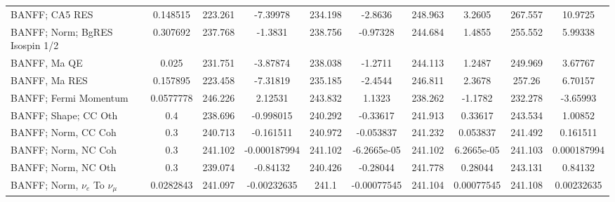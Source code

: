 \begin{tabular}{| l | S | S  S | S  S | S  S | S  S | }
                                                                  BANFF; CA5 RES &        0.148515 &         223.261 &        -7.39978 &         234.198 &         -2.8636 &         248.963 &          3.2605 &         267.557 &         10.9725 \\ 
                                                  BANFF; Norm; BgRES Isospin 1/2 &        0.307692 &         237.768 &         -1.3831 &         238.756 &        -0.97328 &         244.684 &          1.4855 &         255.552 &         5.99338 \\ 
                                                                    BANFF, Ma QE &           0.025 &         231.751 &        -3.87874 &         238.038 &         -1.2711 &         244.113 &          1.2487 &         249.969 &         3.67767 \\ 
                                                                   BANFF, Ma RES &        0.157895 &         223.458 &        -7.31819 &         235.185 &         -2.4544 &         246.811 &          2.3678 &          257.26 &         6.70157 \\ 
                                                           BANFF; Fermi Momentum &       0.0577778 &         246.226 &         2.12531 &         243.832 &          1.1323 &         238.262 &         -1.1782 &         232.278 &        -3.65993 \\ 
                                                            BANFF; Shape; CC Oth &             0.4 &         238.696 &       -0.998015 &         240.292 &        -0.33617 &         241.913 &         0.33617 &         243.534 &         1.00852 \\ 
                                                             BANFF; Norm, CC Coh &             0.3 &         240.713 &       -0.161511 &         240.972 &       -0.053837 &         241.232 &        0.053837 &         241.492 &        0.161511 \\ 
                                                             BANFF; Norm, NC Coh &             0.3 &         241.102 &    -0.000187994 &         241.102 &     -6.2665e-05 &         241.102 &      6.2665e-05 &         241.103 &     0.000187994 \\ 
                                                             BANFF; Norm, NC Oth &             0.3 &         239.074 &        -0.84132 &         240.426 &        -0.28044 &         241.778 &         0.28044 &         243.131 &         0.84132 \\ 
                                           BANFF; Norm, $\nu_{e}$ To $\nu_{\mu}$ &       0.0282843 &         241.097 &     -0.00232635 &           241.1 &     -0.00077545 &         241.104 &      0.00077545 &         241.108 &      0.00232635 \\ 

\end{tabular}
